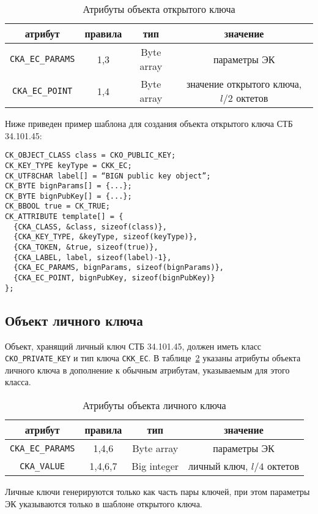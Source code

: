 \begin{table}[H]
\caption{Атрибуты объекта открытого ключа}\label{Table.CRYPTOKI.EcPubkeyAttrs}
\begin{tabular}{|c|c|c|c|}
\hline
атрибут & правила & тип & значение\\
\hline
\hline
\verb|CKA_EC_PARAMS| & 1,3 & Byte array &
параметры ЭК\\
\hline
\verb|CKA_EC_POINT| & 1,4 & Byte array &
значение открытого ключа, $l/2$ октетов\\
\hline
\end{tabular}
\end{table}

Ниже приведен пример шаблона для создания объекта открытого ключа СТБ 34.101.45:
\begin{verbatim}
CK_OBJECT_CLASS class = CKO_PUBLIC_KEY;
CK_KEY_TYPE keyType = CKK_EC;
CK_UTF8CHAR label[] = “BIGN public key object”;
CK_BYTE bignParams[] = {...};
CK_BYTE bignPubKey[] = {...};
CK_BBOOL true = CK_TRUE;
CK_ATTRIBUTE template[] = {
  {CKA_CLASS, &class, sizeof(class)},
  {CKA_KEY_TYPE, &keyType, sizeof(keyType)},
  {CKA_TOKEN, &true, sizeof(true)},
  {CKA_LABEL, label, sizeof(label)-1},
  {CKA_EC_PARAMS, bignParams, sizeof(bignParams)},
  {CKA_EC_POINT, bignPubKey, sizeof(bignPubKey)}
};
\end{verbatim}

\subsection{Объект личного ключа}
Объект, хранящий личный ключ СТБ 34.101.45, должен иметь
класс \verb|CKO_PRIVATE_KEY| и тип ключа \verb|CKK_EC|.
В таблице~\ref{Table.CRYPTOKI.EcPrivkeyAttrs} указаны
атрибуты объекта личного ключа в дополнение к обычным
атрибутам, указываемым для этого класса.

\begin{table}[H]
\caption{Атрибуты объекта личного ключа}\label{Table.CRYPTOKI.EcPrivkeyAttrs}
\begin{tabular}{|c|c|c|c|}
\hline
атрибут & правила & тип & значение\\
\hline
\hline
\verb|CKA_EC_PARAMS| & 1,4,6 & Byte array &
параметры ЭК\\
\hline
\verb|CKA_VALUE| & 1,4,6,7 & Big integer &
личный ключ, $l/4$ октетов\\
\hline
\end{tabular}
\end{table}

Личные ключи генерируются только как часть пары ключей,
при этом параметры ЭК указываются только в шаблоне
открытого ключа.

